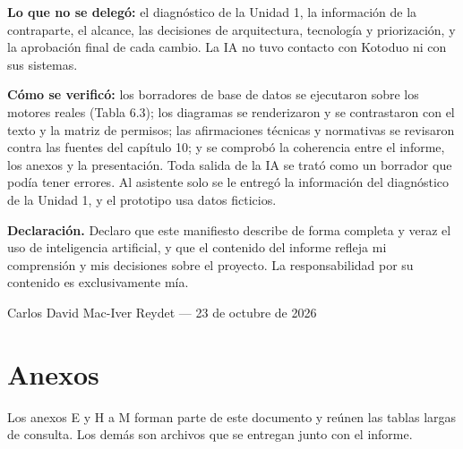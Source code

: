 \documentclass[11pt,a4paper]{article}
\begin{document}
\textbf{Lo que no se delegó:} el diagnóstico de la Unidad 1, la información de la contraparte, el alcance, las decisiones de arquitectura, tecnología y priorización, y la aprobación final de cada cambio. La IA no tuvo contacto con Kotoduo ni con sus sistemas.

\textbf{Cómo se verificó:} los borradores de base de datos se ejecutaron sobre los motores reales (Tabla 6.3); los diagramas se renderizaron y se contrastaron con el texto y la matriz de permisos; las afirmaciones técnicas y normativas se revisaron contra las fuentes del capítulo 10; y se comprobó la coherencia entre el informe, los anexos y la presentación. Toda salida de la IA se trató como un borrador que podía tener errores. Al asistente solo se le entregó la información del diagnóstico de la Unidad 1, y el prototipo usa datos ficticios.

\textbf{Declaración.} Declaro que este manifiesto describe de forma completa y veraz el uso de inteligencia artificial, y que el contenido del informe refleja mi comprensión y mis decisiones sobre el proyecto. La responsabilidad por su contenido es exclusivamente mía.

Carlos David Mac-Iver Reydet --- 23 de octubre de 2026

\newpage
\section{Anexos}

Los anexos E y H a M forman parte de este documento y reúnen las tablas largas de consulta. Los demás son archivos que se entregan junto con el informe.
\end{document}
